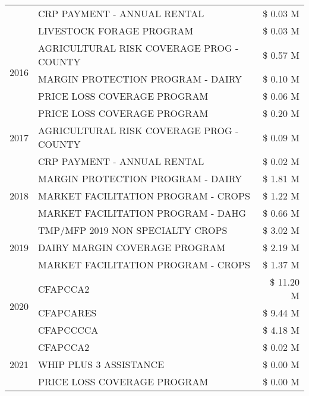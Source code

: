 \begin{tabular}{llr}
 & CRP PAYMENT - ANNUAL RENTAL & \$ 0.03 M \\
 & LIVESTOCK FORAGE PROGRAM & \$ 0.03 M \\
\cline{1-3}
\multirow[t]{3}{*}{2016} & AGRICULTURAL RISK COVERAGE PROG - COUNTY & \$ 0.57 M \\
 & MARGIN PROTECTION PROGRAM - DAIRY & \$ 0.10 M \\
 & PRICE LOSS COVERAGE PROGRAM & \$ 0.06 M \\
\cline{1-3}
\multirow[t]{3}{*}{2017} & PRICE LOSS COVERAGE PROGRAM & \$ 0.20 M \\
 & AGRICULTURAL RISK COVERAGE PROG - COUNTY & \$ 0.09 M \\
 & CRP PAYMENT - ANNUAL RENTAL & \$ 0.02 M \\
\cline{1-3}
\multirow[t]{3}{*}{2018} & MARGIN PROTECTION PROGRAM - DAIRY & \$ 1.81 M \\
 & MARKET FACILITATION PROGRAM - CROPS & \$ 1.22 M \\
 & MARKET FACILITATION PROGRAM - DAHG & \$ 0.66 M \\
\cline{1-3}
\multirow[t]{3}{*}{2019} & TMP/MFP 2019 NON SPECIALTY CROPS & \$ 3.02 M \\
 & DAIRY MARGIN COVERAGE PROGRAM & \$ 2.19 M \\
 & MARKET FACILITATION PROGRAM - CROPS & \$ 1.37 M \\
\cline{1-3}
\multirow[t]{3}{*}{2020} & CFAPCCA2 & \$ 11.20 M \\
 & CFAPCARES & \$ 9.44 M \\
 & CFAPCCCCA & \$ 4.18 M \\
\cline{1-3}
\multirow[t]{3}{*}{2021} & CFAPCCA2 & \$ 0.02 M \\
 & WHIP PLUS 3 ASSISTANCE & \$ 0.00 M \\
 & PRICE LOSS COVERAGE PROGRAM & \$ 0.00 M \\
\cline{1-3}
\bottomrule
\end{tabular}
